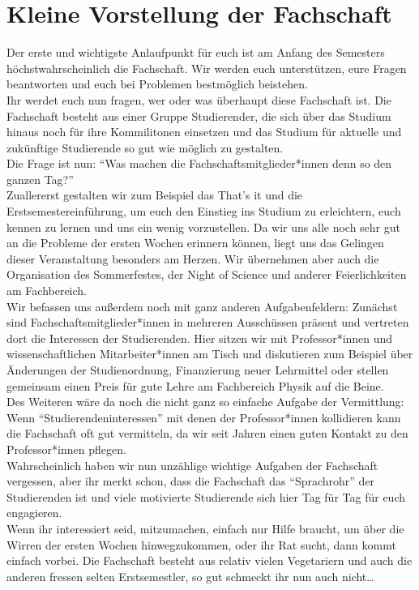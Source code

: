 \section[Die Fachschaft]{Kleine Vorstellung der Fachschaft}
Der erste und wichtigste Anlaufpunkt für euch ist am Anfang des Semesters höchstwahrscheinlich die Fachschaft.
Wir werden euch unterstützen, eure Fragen beantworten und euch bei Problemen bestmöglich beistehen.\\
Ihr werdet euch nun fragen, wer oder was überhaupt diese Fachschaft ist. Die Fachschaft besteht aus einer Gruppe Studierender, die sich über das Studium hinaus noch für ihre Kommilitonen einsetzen und das Studium für aktuelle und zukünftige Studierende so gut wie möglich zu gestalten.\\
Die Frage ist nun: \enquote{Was machen die Fachschaftsmitglieder*innen denn so den ganzen Tag?}\\
Zuallererst gestalten wir zum Beispiel das That's it und die Erstsemestereinführung, um euch den Einstieg ins Studium zu erleichtern, euch kennen zu lernen und uns ein wenig vorzustellen. Da wir uns alle noch sehr gut an die Probleme der ersten Wochen erinnern können, liegt uns das Gelingen dieser Veranstaltung besonders am Herzen. Wir übernehmen aber auch die Organisation des Sommerfestes, der Night of Science und anderer Feierlichkeiten am Fachbereich.\\
Wir befassen uns außerdem noch mit ganz anderen Aufgabenfeldern:
Zunächst sind Fachschaftsmitglieder*innen in mehreren Ausschüssen präsent und vertreten dort die Interessen der Studierenden. Hier sitzen wir mit Professor*innen und wissenschaftlichen Mitarbeiter*innen am Tisch und diskutieren zum Beispiel über Änderungen der Studienordnung, Finanzierung neuer Lehrmittel oder stellen gemeinsam einen Preis für gute Lehre am Fachbereich Physik auf die Beine.\\
Des Weiteren wäre da noch die nicht ganz so einfache Aufgabe der Vermittlung:
Wenn \enquote{Studierendeninteressen} mit denen der Professor*innen kollidieren kann die Fachschaft oft gut vermitteln, da wir seit Jahren einen guten Kontakt zu den Professor*innen pflegen.\\
Wahrscheinlich haben wir nun unzählige wichtige Aufgaben der Fachschaft vergessen, aber ihr merkt schon, dass die Fachschaft das \enquote{Sprachrohr} der Studierenden ist und viele motivierte Studierende sich hier Tag für Tag für euch engagieren.\\
Wenn ihr interessiert seid, mitzumachen, einfach nur Hilfe braucht, um über die Wirren der ersten Wochen hinwegzukommen, oder ihr Rat sucht, dann kommt einfach vorbei. Die Fachschaft besteht aus relativ vielen Vegetariern und auch die anderen fressen selten Erstsemestler, so gut schmeckt ihr nun auch nicht\ldots\\
